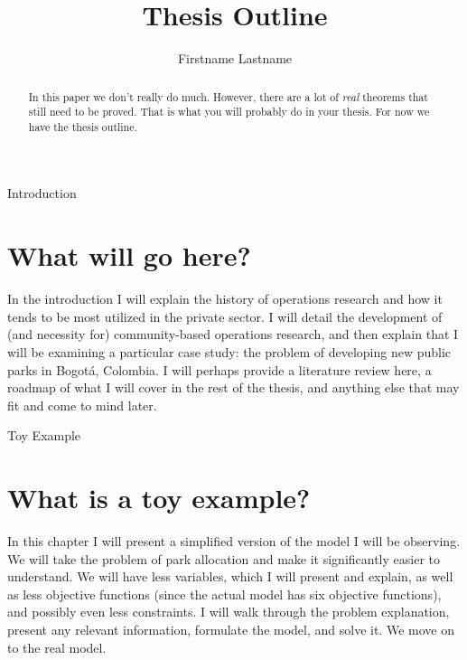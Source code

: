 \documentclass[12pt]{pom_thesis}
\author{Firstname Lastname}
\title{Thesis Outline}
\begin{document}
\maketitle

\begin{abstract}In this paper we don't really do much.  However, there are a lot of {\it real} theorems that still need to be proved. That is what you will probably do in your thesis. For now we have the thesis outline.
\end{abstract}

\tableofcontents

\newpage
{}
\begin{chapter}{Introduction}
\label{Intro}
\section{What will go here?}

In the introduction I will explain the history of operations research and how it tends to be most utilized in the private sector. I will detail the development of (and necessity for) community-based operations research, and then explain that I will be examining a particular case study: the problem of developing new public parks in Bogot\'a, Colombia. I will perhaps provide a literature review here, a roadmap of what I will cover in the rest of the thesis, and anything else that may fit and come to mind later.

\end{chapter}

\begin{chapter}{Toy Example}
\section{What is a toy example?}

In this chapter I will present a simplified version of the model I will be observing. We will take the problem of park allocation and make it significantly easier to understand. We will have less variables, which I will present and explain, as well as less objective functions (since the actual model has six objective functions), and possibly even less constraints. I will walk through the problem explanation, present any relevant information, formulate the model, and solve it. We move on to the real model.
\end{chapter}
\end{document}
